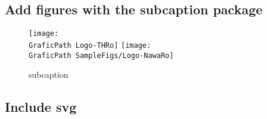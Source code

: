 \subsection{Add figures with the subcaption package}
 \begin{figure}[htb]
 	\centering
 	{\texttt{[image: \\GraficPath Logo-THRo]} }
 	{\texttt{[image: \\GraficPath SampleFigs/Logo-NawaRo]} }
 	\caption[subcaption]{subcaption}\label{FigureAB}
 \end{figure}
 \subsection{Include svg}
% 	
% 	


